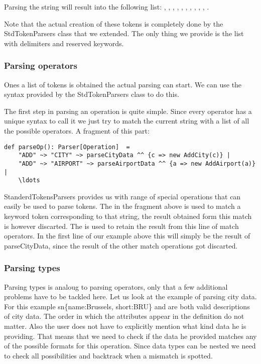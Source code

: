 \par
Parsing the string  will result into
the following list: , , , , ,
, , , , , .
 
\par
Note that the actual creation of these tokens is completely done by the
StdTokenParsers class that we extended. The only thing we provide is the list
with delimiters and reserved keywords.


\subsubsection{Parsing operators}

Ones a list of tokens is obtained the actual parsing can start. We can use the
syntax provided by the StdTokenParsers class to do this.

\par
The first step in parsing an operation is quite simple. Since every operator
has a unique syntax to call it we just try to match the current string with
a list of all the possible operators. A fragment of this part:

\begin{lstlisting}
def parseOp(): Parser[Operation]  =
    "ADD" ~> "CITY" ~> parseCityData ^^ {c => new AddCity(c)} |
    "ADD" ~> "AIRPORT" ~> parseAirportData ^^ {a => new AddAirport(a)} |
    \ldots
\end{lstlisting}

\par
StanderdTokensParsers provides us with range of special operations that can
easily be used to parse tokens. The \sn{\textasciitilde>} in the fragment above is used to
match a keyword token corresponding to that string, the result obtained form
this match is however discarted. The \sn{\textasciicircum\textasciicircum} is
used to retain the result from this line of match operators. In the first line of our example above this will
simply be the result of parseCityData, since the result of the other match
operations got discarted.


\subsubsection{Parsing types}

Parsing types is analoug to parsing operators, only that a few additional
problems have to be tackled here. Let us look at the example of parsing city
data. For this example sn{\{name:Brussels, short:BRU\}} and  are both valid descriptions of city data. The order in which
the attributes appear in the definition do not matter. Also the user does not
have to explicitly mention what kind data he is providing. That means that we
need to check if the data he provided matches any of the possible formats for
this operation. Since data types can be nested we need to check all
possibilities and backtrack when a mismatch is spotted.

